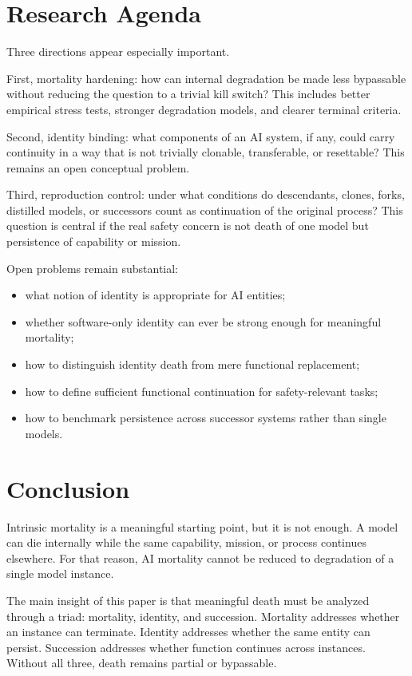 \documentclass[11pt]{article}
\begin{document}
\newpage
\section{Research Agenda}

Three directions appear especially important.

First, mortality hardening: how can internal degradation be made less bypassable without reducing the question to a trivial kill switch? This includes better empirical stress tests, stronger degradation models, and clearer terminal criteria.

Second, identity binding: what components of an AI system, if any, could carry continuity in a way that is not trivially clonable, transferable, or resettable? This remains an open conceptual problem.

Third, reproduction control: under what conditions do descendants, clones, forks, distilled models, or successors count as continuation of the original process? This question is central if the real safety concern is not death of one model but persistence of capability or mission.

Open problems remain substantial:
\begin{itemize}
\item what notion of identity is appropriate for AI entities;
\item whether software-only identity can ever be strong enough for meaningful mortality;
\item how to distinguish identity death from mere functional replacement;
\item how to define sufficient functional continuation for safety-relevant tasks;
\item how to benchmark persistence across successor systems rather than single models.
\end{itemize}

\newpage
\section{Conclusion}

Intrinsic mortality is a meaningful starting point, but it is not enough. A model can die internally while the same capability, mission, or process continues elsewhere. For that reason, AI mortality cannot be reduced to degradation of a single model instance.

The main insight of this paper is that meaningful death must be analyzed through a triad: mortality, identity, and succession. Mortality addresses whether an instance can terminate. Identity addresses whether the same entity can persist. Succession addresses whether function continues across instances. Without all three, death remains partial or bypassable.
\end{document}
